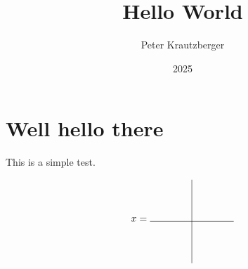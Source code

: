 \documentclass{amsart}
\begin{document}
\title{Hello World}
\author{Peter Krautzberger}
\date{2025}

\maketitle

\section{Well hello there}

This is a simple test.


\begin{equation} \label{tikzPic}
    x = \begin{tikzpicture}[baseline=0pt]
        \draw (-1.5,0) -- (1.5,0);
        \draw (0,-1.5) -- (0,1.5);
    \end{tikzpicture}
\end{equation}
    
\end{document}

